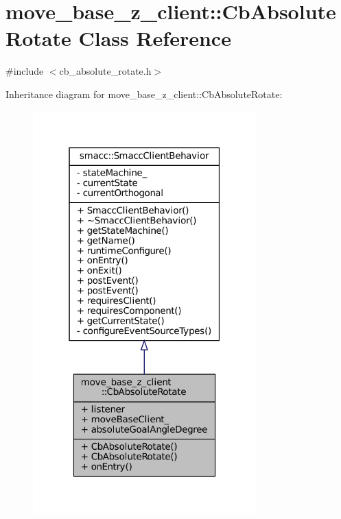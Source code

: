\hypertarget{classmove__base__z__client_1_1CbAbsoluteRotate}{}\section{move\+\_\+base\+\_\+z\+\_\+client\+:\+:Cb\+Absolute\+Rotate Class Reference}
\label{classmove__base__z__client_1_1CbAbsoluteRotate}


{\ttfamily \#include $<$cb\+\_\+absolute\+\_\+rotate.\+h$>$}



Inheritance diagram for move\+\_\+base\+\_\+z\+\_\+client\+:\+:Cb\+Absolute\+Rotate\+:
\nopagebreak
\begin{figure}[H]
\begin{center}
\leavevmode
\includegraphics[width=244pt]{classmove__base__z__client_1_1CbAbsoluteRotate__inherit__graph}
\end{center}
\end{figure}


